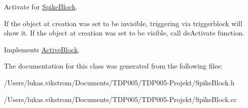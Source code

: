 Activate for \hyperlink{class_spike_block}{Spike\+Block}. 

If the object at creation was set to be invisible, triggering via triggerblock will show it. If the object at creation was set to be visible, call de\+Activate function. 

Implements \hyperlink{class_active_block}{Active\+Block}.



The documentation for this class was generated from the following files\+:\begin{DoxyCompactItemize}
\item 
/\+Users/lukas.\+vikstrom/\+Documents/\+T\+D\+P005/\+T\+D\+P005-\/\+Projekt/Spike\+Block.\+h\item 
/\+Users/lukas.\+vikstrom/\+Documents/\+T\+D\+P005/\+T\+D\+P005-\/\+Projekt/Spike\+Block.\+cc\end{DoxyCompactItemize}
